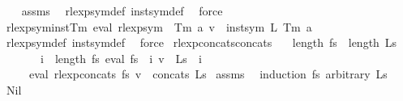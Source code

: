 \begin{isabellebody}
%
\isadelimproof
\ \ %
\endisadelimproof
%
\isatagproof
{}\isamarkupfalse%
\ assms\ \isamarkupfalse%
\ rlexp{\isacharunderscore}{\kern0pt}sym{\isacharunderscore}{\kern0pt}def\ inst{\isacharunderscore}{\kern0pt}sym{\isacharunderscore}{\kern0pt}def\ \isamarkupfalse%
\ force%
\endisatagproof
{\isafoldproof}%
%
\isadelimproof
\isanewline
%
\endisadelimproof
\isanewline
{}\isamarkupfalse%
\ rlexp{\isacharunderscore}{\kern0pt}sym{\isacharunderscore}{\kern0pt}inst{\isacharunderscore}{\kern0pt}Tm{\isacharcolon}{\kern0pt}\ {\isachardoublequoteopen}eval\ {\isacharparenleft}{\kern0pt}rlexp{\isacharunderscore}{\kern0pt}sym\ {\isasymgamma}{\isacharprime}{\kern0pt}\ {\isacharparenleft}{\kern0pt}Tm\ a{\isacharparenright}{\kern0pt}{\isacharparenright}{\kern0pt}\ v\ {\isacharequal}{\kern0pt}\ inst{\isacharunderscore}{\kern0pt}sym\ L\ {\isacharparenleft}{\kern0pt}Tm\ a{\isacharparenright}{\kern0pt}{\isachardoublequoteclose}\isanewline
%
\isadelimproof
\ \ %
\endisadelimproof
%
\isatagproof
{}\isamarkupfalse%
\ rlexp{\isacharunderscore}{\kern0pt}sym{\isacharunderscore}{\kern0pt}def\ inst{\isacharunderscore}{\kern0pt}sym{\isacharunderscore}{\kern0pt}def\ \isamarkupfalse%
\ force%
\endisatagproof
{\isafoldproof}%
%
\isadelimproof
\isanewline
%
\endisadelimproof
\isanewline
{}\isamarkupfalse%
\ rlexp{\isacharunderscore}{\kern0pt}concats{\isacharunderscore}{\kern0pt}concats{\isacharcolon}{\kern0pt}\isanewline
\ \ \ {\isachardoublequoteopen}length\ fs\ {\isacharequal}{\kern0pt}\ length\ Ls{\isachardoublequoteclose}\isanewline
\ \ \ \ \ \ \ {\isachardoublequoteopen}{\isasymforall}i\ {\isacharless}{\kern0pt}\ length\ fs{\isachardot}{\kern0pt}\ eval\ {\isacharparenleft}{\kern0pt}fs\ {\isacharbang}{\kern0pt}\ i{\isacharparenright}{\kern0pt}\ v\ {\isacharequal}{\kern0pt}\ Ls\ {\isacharbang}{\kern0pt}\ i{\isachardoublequoteclose}\isanewline
\ \ \ \ \ {\isachardoublequoteopen}eval\ {\isacharparenleft}{\kern0pt}rlexp{\isacharunderscore}{\kern0pt}concats\ fs{\isacharparenright}{\kern0pt}\ v\ {\isacharequal}{\kern0pt}\ concats\ Ls{\isachardoublequoteclose}\isanewline
%
\isadelimproof
%
\endisadelimproof
%
\isatagproof
{}\isamarkupfalse%
\ assms\ \isamarkupfalse%
\ {\isacharparenleft}{\kern0pt}induction\ fs\ arbitrary{\isacharcolon}{\kern0pt}\ Ls{\isacharparenright}{\kern0pt}\isanewline
\ \ \isamarkupfalse%
\ Nil\isanewline
\ \ \isamarkupfalse%

\end{isabellebody}
